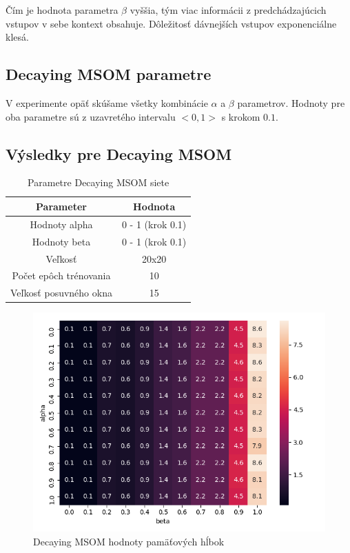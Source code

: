 Čím je hodnota parametra $\beta$ vyššia, tým viac informácii z predchádzajúcich vstupov v sebe
kontext obsahuje. Dôležitosť dávnejších vstupov exponenciálne klesá.

\subsection{Decaying MSOM parametre}
V experimente opäť skúšame všetky kombinácie $\alpha$ a $\beta$ parametrov.
Hodnoty pre oba parametre sú z uzavretého intervalu $<0, 1>$ s krokom $0.1$.

\subsection{Výsledky pre Decaying MSOM}
\begin{table}[h!]
    \centering
    \begin{tabular}{|c|c|} 
     \hline
     Parameter & Hodnota \\ 
     \hline\hline
     Hodnoty alpha & 0 - 1 (krok 0.1)  \\ 
     \hline
     Hodnoty beta & 0 - 1  (krok 0.1) \\ 
     \hline
     Veľkosť & 20x20  \\
     \hline
     Počet epôch trénovania & 10  \\
     \hline
     Veľkosť posuvného okna & 15 \\
     \hline
    \end{tabular}
    \caption{Parametre Decaying MSOM siete}
    \label{table:1}
    \end{table}
    
    
    \begin{figure}[H]
        \centering
        \includegraphics[width=\textwidth]{assets/dm_memory_span}
        \caption{Decaying MSOM hodnoty pamäťových hĺbok}
        \label{decay_memory_span}
    \end{figure}
    
